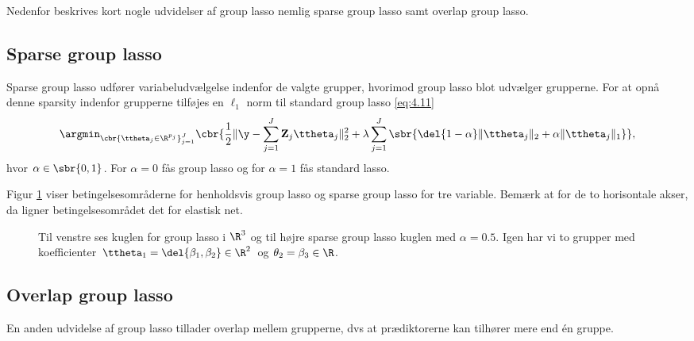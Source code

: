 Nedenfor beskrives kort nogle udvidelser af group lasso nemlig sparse group lasso samt overlap group lasso.
%
\subsection{Sparse group lasso}
Sparse group lasso udfører variabeludvælgelse indenfor de valgte grupper, hvorimod group lasso blot udvælger grupperne.
For at opnå denne sparsity indenfor grupperne tilføjes en \(\ell_1\) norm til standard group lasso \eqref{eq:4.11} 
\begin{align*}
\argmin_{\cbr{\ttheta_j \in \R^{p_j}}_{j=1}^J} \cbr{\frac{1}{2} \Vert \y - \sum_{j=1}^J \mathbf{Z}_{j} \ttheta_j \Vert_2^2 + \lambda \sum_{j=1}^J \sbr{ \del{1-\alpha} \Vert \ttheta_j \Vert_2 + \alpha \Vert \ttheta_j \Vert_1}},
\end{align*}
hvor \(\alpha \in \sbr{0,1}\).
For \(\alpha = 0 \) fås group lasso og for \(\alpha = 1\) fås standard lasso.

Figur \ref{fig:sparse_group_lasso} viser betingelsesområderne for henholdsvis group lasso og sparse group lasso for tre variable.
Bemærk at for de to horisontale akser, da ligner betingelsesområdet det for elastisk net.
%
\begin{figure}[H]
\centering
\caption{Til venstre ses kuglen for group lasso i \(\R^3\) og til højre sparse group lasso kuglen med \(\alpha = 0.5\).
Igen har vi to grupper med koefficienter \(\ttheta_1 = \del{\beta_1, \beta_2} \in \R^2\) og \(\theta_2 = \beta_3 \in \R\).}
\label{fig:sparse_group_lasso}
\end{figure}
%




\subsection{Overlap group lasso}
En anden udvidelse af group lasso tillader overlap mellem grupperne, dvs at prædiktorerne kan tilhører mere end én gruppe.

\newpage
